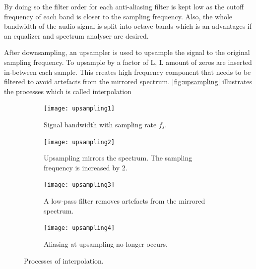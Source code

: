 By doing so the filter order for each anti-aliasing filter is kept low as the cutoff frequency of each band is closer to the sampling frequency. Also, the whole bandwidth of the audio signal is split into octave bands which is an advantages if an equalizer and spectrum analyser are desired.

After downsampling, an upsampler is used to upsample the signal to the original sampling frequency. To upsample by a factor of L, L amount of zeros are inserted in-between each sample. This creates high frequency component that needs to be filtered to avoid artefacts from the mirrored spectrum. \autoref{fig:upsampling} illustrates the processes which is called interpolation

\begin{figure}[H]
\centering
\begin{subfigure}[t]{0.44\textwidth}
\texttt{[image: upsampling1]}
	\caption{Signal bandwidth with sampling rate $f_s$.}
	\label{fig:upsampling1}
\end{subfigure}
\hspace{6mm} 
\begin{subfigure}[t]{0.47\textwidth}
\texttt{[image: upsampling2]}
	\caption{Upsampling mirrors the spectrum. The sampling frequency is increased by 2.}
	\label{fig:upsampling2}
\end{subfigure}
\hspace{6mm}
\begin{subfigure}[b]{0.44\textwidth}
\texttt{[image: upsampling3]}
	\caption{A low-pass filter removes artefacts from the mirrored spectrum.}
	\label{fig:upsampling3}
\end{subfigure}
\hspace{6mm} 
\begin{subfigure}[b]{0.47\textwidth}
\texttt{[image: upsampling4]}
	\caption{Aliasing at upsampling no longer occurs.}
	\label{fig:upsampling4}
\end{subfigure}
\caption{Processes of interpolation.}
\label{fig:upsampling}
\end{figure}








